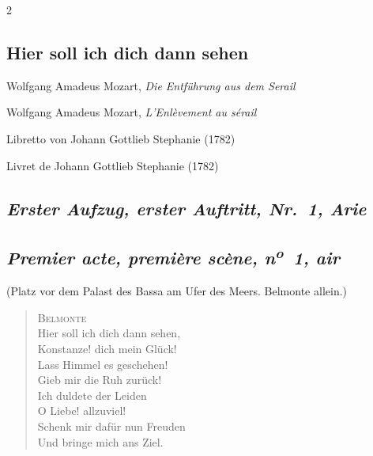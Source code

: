\documentclass[a4paper,12pt]{article}
\newcommand\chunks[2]{%
\begin{leftcolumn*}\begin{otherlanguage}{german}%
{#1}%
\end{otherlanguage}\end{leftcolumn*}%
\begin{rightcolumn}\begin{otherlanguage}{french}%
{#2}%
\end{otherlanguage}\end{rightcolumn}%
}
\newcommand\strophe[1]{\subsection*{\normalsize\normalfont\itshape #1}}
\begin{document}
\thispagestyle{empty}
\setlength{\columnsep}{8mm}


\begin{paracol}{2}

  \chunks{\section*{Hier soll ich dich dann sehen}}
         {}

  \chunks{\noindent\raggedright\small Wolfgang Amadeus Mozart, \textit{Die Entführung aus dem Serail}}
         {\noindent\raggedright\small Wolfgang Amadeus Mozart, \textit{L’Enlèvement au sérail}}

  \chunks{\noindent\raggedright\small Libretto von Johann Gottlieb Stephanie (1782)}
         {\noindent\raggedright\small Livret de Johann Gottlieb Stephanie (1782)}

  \chunks{\strophe{Erster Aufzug, erster Auftritt, Nr.~1, Arie}}
         {\strophe{Premier acte, première scène, n\textsuperscript{o}~1, air}}

  \chunks{\noindent\small(Platz vor dem Palast des Bassa am Ufer des Meers. Belmonte allein.)}
         {}

  \chunks{\begin{verse}
          \textsc{Belmonte}\\[\medskipamount]
          Hier soll ich dich dann sehen,\\
          Konstanze! dich mein Glück!\\
          Lass Himmel es geschehen!\\
          Gieb mir die Ruh zurück!\\
          Ich duldete der Leiden\\
          O Liebe! allzuviel!\\
          Schenk mir dafür nun Freuden\\
          Und bringe mich ans Ziel.
          \end{verse}}
         {}
\end{paracol}
\end{document}
